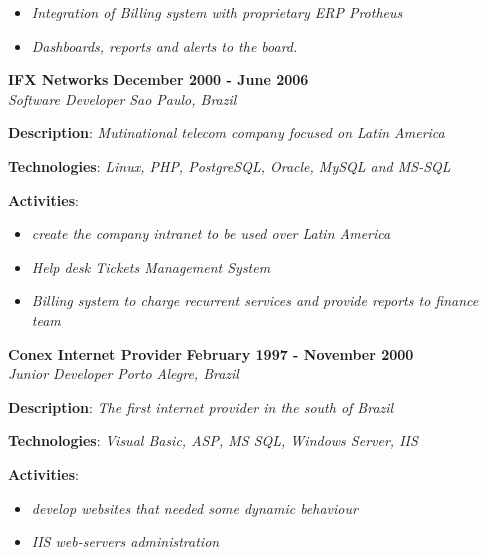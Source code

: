 \documentclass[margin]{res}
\begin{document}
\begin{resume}
\begin{description}
{\begin{itemize}
              \item{\textit{Integration of Billing system with proprietary ERP Protheus}}
              \item{\textit{Dashboards, reports and alerts to the board.}}
            \end{itemize}
    }
      \end{description}
    \textbf{IFX Networks} \hfill \textbf{December 2000 - June 2006}\\
  \textit{Software Developer} \hfill \textit{Sao Paulo, Brazil}\\
  \begin{description}
    \item{\textbf{Description}: \textit{Mutinational telecom company focused on Latin America}}
    \item{\textbf{Technologies}: \textit{Linux, PHP, PostgreSQL, Oracle, MySQL and MS-SQL}}
    \item{
      \textbf{Activities}:
      \begin{itemize}
              \item{\textit{create the company intranet to be used over Latin America}}
              \item{\textit{Help desk Tickets Management System}}
              \item{\textit{Billing system to charge recurrent services and provide reports to finance team}}
            \end{itemize}
    }
      \end{description}
    \textbf{Conex Internet Provider} \hfill \textbf{February 1997 - November 2000}\\
  \textit{Junior Developer} \hfill \textit{Porto Alegre, Brazil}\\
  \begin{description}
    \item{\textbf{Description}: \textit{The first internet provider in the south of Brazil}}
    \item{\textbf{Technologies}: \textit{Visual Basic, ASP, MS SQL, Windows Server, IIS}}
    \item{
      \textbf{Activities}:
      \begin{itemize}
              \item{\textit{develop websites that needed some dynamic behaviour}}
              \item{\textit{IIS web-servers administration}}
            \end{itemize}
    }
      \end{description}
  

\end{resume}
\end{document}
